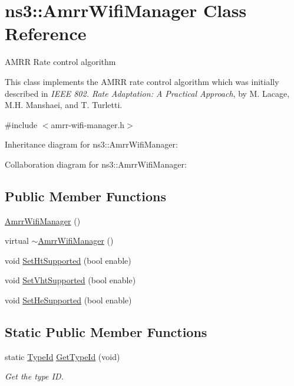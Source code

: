 \hypertarget{classns3_1_1AmrrWifiManager}{}\section{ns3\+:\+:Amrr\+Wifi\+Manager Class Reference}
\label{classns3_1_1AmrrWifiManager}


A\+M\+RR Rate control algorithm

This class implements the A\+M\+RR rate control algorithm which was initially described in {\itshape I\+E\+EE 802. Rate Adaptation\+: A Practical Approach}, by M. Lacage, M.\+H. Manshaei, and T. Turletti.  




{\ttfamily \#include $<$amrr-\/wifi-\/manager.\+h$>$}



Inheritance diagram for ns3\+:\+:Amrr\+Wifi\+Manager\+:


Collaboration diagram for ns3\+:\+:Amrr\+Wifi\+Manager\+:
\subsection*{Public Member Functions}
\begin{DoxyCompactItemize}
\item 
\hyperlink{classns3_1_1AmrrWifiManager_af0b96ccf9682bccd9e0108c6fb1e26bb}{Amrr\+Wifi\+Manager} ()
\item 
virtual \hyperlink{classns3_1_1AmrrWifiManager_a1648c195ac6a9d5ddc48d4d473db66b0}{$\sim$\+Amrr\+Wifi\+Manager} ()
\item 
void \hyperlink{classns3_1_1AmrrWifiManager_a1049dc574599eacee7cd30dcedc588e3}{Set\+Ht\+Supported} (bool enable)
\item 
void \hyperlink{classns3_1_1AmrrWifiManager_ae753502f7288f65ccb64c0aa55606063}{Set\+Vht\+Supported} (bool enable)
\item 
void \hyperlink{classns3_1_1AmrrWifiManager_a5843ff1f91c5734ceaaed3a53aaba30f}{Set\+He\+Supported} (bool enable)
\end{DoxyCompactItemize}
\subsection*{Static Public Member Functions}
\begin{DoxyCompactItemize}
\item 
static \hyperlink{classns3_1_1TypeId}{Type\+Id} \hyperlink{classns3_1_1AmrrWifiManager_a426bfbdf2e0aea8351eeb440ffea684c}{Get\+Type\+Id} (void)
\begin{DoxyCompactList}\small\item\em Get the type ID. \end{DoxyCompactList}\end{DoxyCompactItemize}
